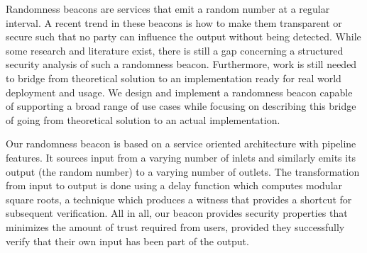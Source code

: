 Randomness beacons are services that emit a random number at a regular interval.
A recent trend in these beacons is how to make them transparent or secure such that no party can influence the output without being detected.
While some research and literature exist, there is still a gap concerning a structured security analysis of such a randomness beacon.
Furthermore, work is still needed to bridge from theoretical solution to an implementation ready for real world deployment and usage.
We design and implement a randomness beacon capable of supporting a broad range of use cases while focusing on describing this bridge of going from theoretical solution to an actual implementation.%

Our randomness beacon is based on a service oriented architecture with pipeline features.
It sources input from a varying number of inlets and similarly emits its output (the random number) to a varying number of outlets.
The transformation from input to output is done using a delay function which computes modular square roots, a technique which produces a witness that provides a shortcut for subsequent verification.
All in all, our beacon provides security properties that minimizes the amount of trust required from users, provided they successfully verify that their own input has been part of the output.

